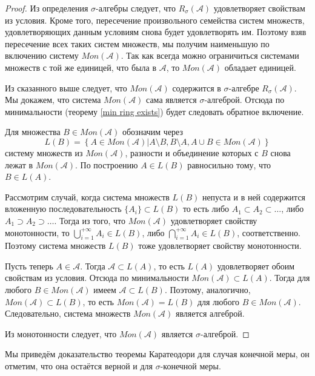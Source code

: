\documentclass[12pt]{article}
\numberwithin{theorem}{section}
\theoremstyle{definition}
\newcommand{\calA}{\mathcal{A}}
\newcommand{\defineset}[2]{\left\{
	\left.
	#1
	\right\vert
	#2
	\right\}}
\begin{document}
	\begin{proof}
		Из определения $ \sigma $-алгебры следует, что $ R_{\sigma}(\calA) $ удовлетворяет свойствам из условия.
		Кроме того, пересечение произвольного семейства систем множеств, удовлетворяющих данным условиям
		снова будет удовлетворять им. Поэтому взяв пересечение всех таких систем множеств,
		мы получим наименьшую по включению систему $ Mon(\calA) $.
		Так как всегда можно ограничиться системами множеств с той же единицей, что была в $ \calA $,
		то $ Mon(\calA) $ обладает единицей.
		
		Из сказанного выше следует, что $ Mon(\calA) $ содержится в $ \sigma $-алгебре $ R_{\sigma}(\calA) $.
		Мы докажем, что система $ Mon(\calA) $ сама является $ \sigma $-алгеброй.
		Отсюда по минимальности (теорему \ref{min ring exists}) будет следовать обратное включение.
		
		Для множества $ B \in Mon(\calA) $ обозначим через 
		$$ L(B) 
		= \defineset
		{A \in Mon(\calA)}
		{A \setminus B, B \setminus A, A \cup B \in Mon(\calA)} $$ 
		систему множеств из $ Mon(\calA) $, 
		разности и объединение которых с $ B $ снова лежат в $ Mon(\calA) $.
		По построению $ A \in L(B) $ равносильно тому, что $ B \in L(A) $.
		
		Рассмотрим случай, когда система множеств $ L(B) $ непуста и в ней 
		содержится вложенную последовательность $ \{A_i\} \subset L(B) $
		то есть либо $ A_1 \subset A_2 \subset \ldots $, либо $ A_1 \supset A_2 \supset \ldots $.
		Тогда из того, что $ Mon(\calA) $ удовлетворяет свойству монотонности,
		то $ \bigcup\limits_{i = 1}^{+\infty} A_i \in L(B) $,
		либо $ \bigcap\limits_{i = 1}^{+\infty} A_i \in L(B) $, соответственно.
		Поэтому система множеств $ L(B) $ тоже удовлетворяет свойству монотонности.
		
		Пусть теперь $ A \in \calA $. Тогда $ \calA \subset L(A) $, то есть $ L(A) $ удовлетворяет обоим свойствам из условия. 
		Отсюда по минимальности $ Mon(\calA) \subset L(A) $.
		Тогда для любого $ B \in Mon(\calA) $ имеем $ \calA \subset L(B) $.
		Поэтому, аналогично, $ Mon(\calA) \subset L(B) $,
		то есть $ Mon(\calA) = L(B) $ для любого $ B \in Mon(\calA) $.
		Следовательно, система множеств $ Mon(\calA) $ является алгеброй.
		
		Из монотонности следует, что $ Mon(\calA) $ является $ \sigma $-алгеброй.
	\end{proof}
	
	Мы приведём доказательство теоремы Каратеодори для случая конечной меры, он отметим, 
	что она остаётся верной и для $ \sigma $-конечной меры.
	
\end{document}
